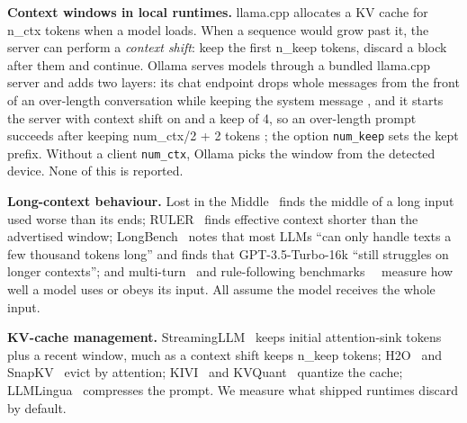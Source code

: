 \documentclass[conference,10pt]{IEEEtran}
\begin{document}

\textbf{Context windows in local runtimes.} llama.cpp allocates a KV cache for n\_ctx tokens when a model loads. When a sequence would grow past it, the server can perform a \emph{context shift}: keep the first n\_keep tokens, discard a block after them and continue. Ollama serves models through a bundled llama.cpp server and adds two layers: its chat endpoint drops whole messages from the front of an over-length conversation while keeping the system message%
, and it starts the server with context shift on and a keep of 4, so an over-length prompt succeeds after keeping num\_ctx/2 + 2 tokens%
; the option \texttt{num\_keep} sets the kept prefix. Without a client \texttt{num\_ctx}, Ollama picks the window from the detected device. None of this is reported.

\textbf{Long-context behaviour.} Lost in the Middle~\cite{liu2024lost} finds the middle of a long input used worse than its ends; RULER~\cite{hsieh2024ruler} finds effective context shorter than the advertised window; LongBench~\cite{bai2024longbench} notes that most LLMs ``can only handle texts a few thousand tokens long'' and finds that GPT-3.5-Turbo-16k ``still struggles on longer contexts''; and multi-turn~\cite{laban2025lost} and rule-following benchmarks~\cite{zhou2023ifeval}~\cite{mu2023rules} measure how well a model uses or obeys its input. All assume the model receives the whole input.

\textbf{KV-cache management.} StreamingLLM~\cite{xiao2024streamingllm} keeps initial attention-sink tokens plus a recent window, much as a context shift keeps n\_keep tokens; H2O~\cite{zhang2023h2o} and SnapKV~\cite{li2024snapkv} evict by attention; KIVI~\cite{liu2024kivi} and KVQuant~\cite{hooper2024kvquant} quantize the cache; LLMLingua~\cite{jiang2023llmlingua} compresses the prompt. We measure what shipped runtimes discard by default.
\end{document}
